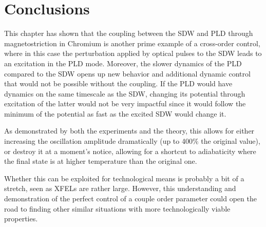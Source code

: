 \section{Conclusions}
This chapter has shown that the coupling between the SDW and PLD through magnetostriction in Chromium is another prime example of a cross-order control, where in this case the perturbation applied by optical pulses to the SDW leads to an excitation in the PLD mode.
Moreover, the slower dynamics of the PLD compared to the SDW opens up new behavior and additional dynamic control that would not be possible without the coupling.
If the PLD would have dynamics on the same timescale as the SDW, changing its potential through excitation of the latter would not be very impactful since it would follow the minimum of the potential as fast as the excited SDW would change it.

As demonstrated by both the experiments and the theory, this allows for either increasing the oscillation amplitude dramatically (up to 400\% the original value), or destroy it at a moment's notice, allowing for a shortcut to adiabaticity where the final state is at higher temperature than the original one.

Whether this can be exploited for technological means is probably a bit of a stretch, seen as XFELs are rather large. However, this understanding and demonstration of the perfect control of a couple order parameter could open the road to finding other similar situations with more technologically viable properties.   


\printbibliography

